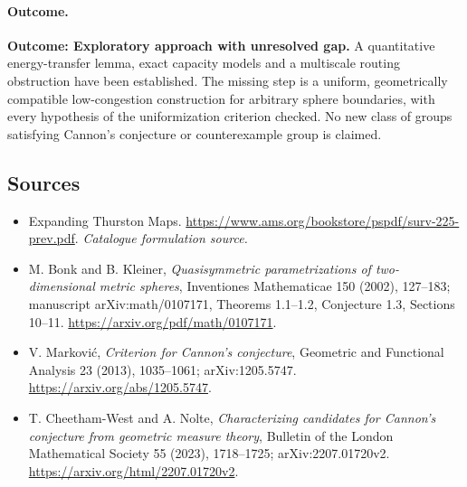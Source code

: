 \documentclass[11pt,a4paper]{article}
\numberwithin{equation}{section}
\begin{document}
\paragraph{Outcome.}
\textbf{Outcome: Exploratory approach with unresolved gap.}
A quantitative energy-transfer lemma, exact capacity models and a multiscale
routing obstruction have been established. The missing step is a uniform,
geometrically compatible low-congestion construction for arbitrary sphere
boundaries, with every hypothesis of the uniformization criterion checked.
No new class of groups satisfying Cannon's conjecture or counterexample
group is claimed.

\subsection{Sources}
\begin{itemize}\raggedright
\item[\textnormal{[S1]}]\hypertarget{source:30000030:1}{} Expanding Thurston Maps.
\url{https://www.ams.org/bookstore/pspdf/surv-225-prev.pdf}.
{\small\textit{Catalogue formulation source.}}
\item[\textnormal{[E1]}]\hypertarget{extra:30000030:1}{} M. Bonk and B. Kleiner,
\emph{Quasisymmetric parametrizations of two-dimensional metric spheres},
Inventiones Mathematicae 150 (2002), 127--183; manuscript
arXiv:math/0107171, Theorems 1.1--1.2, Conjecture 1.3, Sections 10--11.
\url{https://arxiv.org/pdf/math/0107171}.
\item[\textnormal{[E2]}]\hypertarget{extra:30000030:2}{} V. Markovi\'c,
\emph{Criterion for Cannon's conjecture}, Geometric and Functional Analysis
23 (2013), 1035--1061; arXiv:1205.5747.
\url{https://arxiv.org/abs/1205.5747}.
\item[\textnormal{[E3]}]\hypertarget{extra:30000030:3}{} T. Cheetham-West and A. Nolte,
\emph{Characterizing candidates for Cannon's conjecture from geometric
measure theory}, Bulletin of the London Mathematical Society 55 (2023),
1718--1725; arXiv:2207.01720v2.
\url{https://arxiv.org/html/2207.01720v2}.

\end{itemize}
\end{document}

